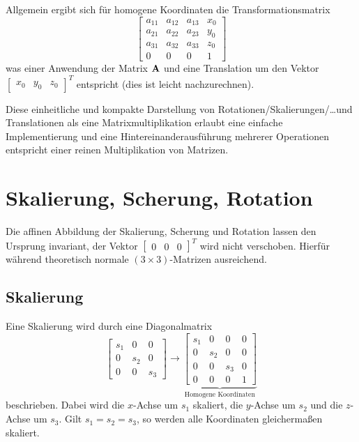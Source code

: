 			Allgemein ergibt sich für homogene Koordinaten die Transformationsmatrix
			\begin{equation*}
				\begin{bmatrix}
					a_{11} & a_{12} & a_{13} & x_0 \\
					a_{21} & a_{22} & a_{23} & y_0 \\
					a_{31} & a_{32} & a_{33} & z_0 \\
					0      & 0      & 0      & 1
				\end{bmatrix}
			\end{equation*}
			was einer Anwendung der Matrix \( \boldsymbol{\mathrm{A}} \) und eine Translation um den Vektor \( \begin{bmatrix} x_0 & y_0 & z_0 \end{bmatrix}^T \) entspricht (dies ist leicht nachzurechnen).
			
			Diese einheitliche und kompakte Darstellung von Rotationen/Skalierungen/\dots und Translationen als eine Matrixmultiplikation erlaubt eine einfache Implementierung und eine Hintereinanderausführung mehrerer Operationen entspricht einer reinen Multiplikation von Matrizen.

	\section{Skalierung, Scherung, Rotation}
		Die affinen Abbildung der Skalierung, Scherung und Rotation lassen den Ursprung invariant, \dh der Vektor \( \begin{bmatrix} 0 & 0 & 0 \end{bmatrix}^T \) wird nicht verschoben. Hierfür während theoretisch normale \( (3 \times 3) \)-Matrizen ausreichend.

		\subsection{Skalierung}
			Eine Skalierung wird durch eine Diagonalmatrix
			\begin{equation*}
				\begin{bmatrix}
					s_1 & 0   & 0   \\
					0   & s_2 & 0   \\
					0   & 0   & s_3
				\end{bmatrix}
				\to
				\underbrace{
					\begin{bmatrix}
						s_1 & 0   & 0   & 0 \\
						0   & s_2 & 0   & 0 \\
						0   & 0   & s_3 & 0 \\
						0   & 0   & 0   & 1
					\end{bmatrix}
				}_\text{Homogene Koordinaten}
			\end{equation*}
			beschrieben. Dabei wird die \(x\)-Achse um \(s_1\) skaliert, die \(y\)-Achse um \(s_2\) und die \(z\)-Achse um \(s_3\). Gilt \( s_1 = s_2 = s_3 \), so werden alle Koordinaten gleichermaßen skaliert.

